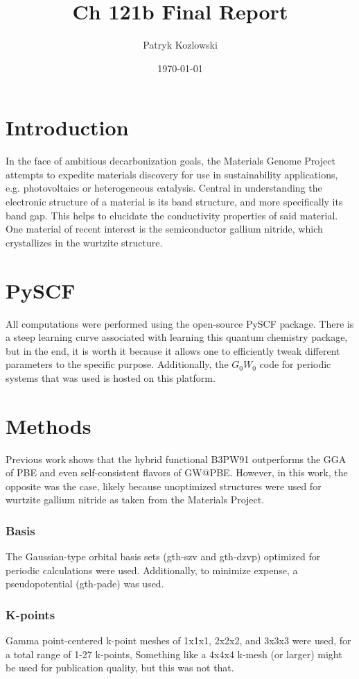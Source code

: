 \documentclass[12pt]{article}
\author{Patryk Kozlowski}
\title{Ch 121b Final Report}
\date{\today}
\begin{document}
\maketitle
\section{Introduction}
In the face of ambitious decarbonization goals, the Materials Genome Project attempts to expedite materials discovery for use in sustainability applications, e.g. photovoltaics or heterogeneous catalysis. Central in understanding the electronic structure of a material is its band structure, and more specifically its band gap. This helps to elucidate the conductivity properties of said material. One material of recent interest is the semiconductor gallium nitride, which crystallizes in the wurtzite structure.
\section{PySCF}
All computations were performed using the open-source PySCF package. \autocite{sun_recent_2020} There is a steep learning curve associated with learning this quantum chemistry package, but in the end, it is worth it because it allows one to efficiently tweak different parameters to the specific purpose. Additionally, the $G_0W_0$ code for periodic systems that was used \autocite{lei_gaussian-based_2022} is hosted on this platform.
\section{Methods}
Previous work shows that the hybrid functional B3PW91 outperforms the GGA of PBE and even self-consistent flavors of GW@PBE. \autocite{crowley_resolution_2016} However, in this work, the opposite was the case, likely because unoptimized structures were used for wurtzite gallium nitride as taken from the Materials Project. \autocite{noauthor_mp-804_nodate}
\subsubsection{Basis}
The Gaussian-type orbital basis sets (gth-szv and gth-dzvp) optimized for periodic calculations were used. Additionally, to minimize expense, a pseudopotential (gth-pade) was used.
\subsubsection{K-points}
Gamma point-centered k-point meshes of 1x1x1, 2x2x2, and 3x3x3 were used, for a total range of 1-27 k-points, Something like a 4x4x4 k-mesh (or larger) might be used for publication quality, but this was not that.
\end{document}
